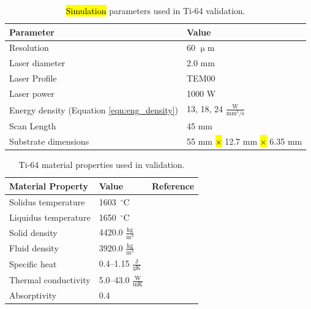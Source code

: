 \documentclass[metals,article,accept,pdftex,moreauthors]{Definitions/mdpi}
\begin{document}
\begin{table}[H]
\caption{\hl{Simulation} %
 parameters used in Ti-64 validation.}
\label{tab:ti64_parameters}
\begin{tabularx}{\textwidth}{CC}
\toprule
\textbf{Parameter} & \textbf{Value} \\ \midrule
Resolution & 60 $\upmu$m \\ \midrule
Laser diameter & 2.0 mm \\ \midrule
Laser Profile & TEM00 \\ \midrule
Laser power & 1000 W \\ \midrule
Energy density (Equation \eqref{eqn:eng_density}) & 13, 18, 24 $\frac{\text{W}}{\text{mm}^3/\text{s}}$ \\ \midrule
Scan Length & 45 mm \\ \midrule
Substrate dimensions & 55 mm \hl{$\times$} %
12.7 mm \hl{$\times$} 6.35 mm \\ 
\bottomrule
\end{tabularx}
\end{table}

\vspace{-12pt}
\begin{table}[H]
\caption{Ti-64 material properties used in validation.}
\label{tab:ti64_properties}
\begin{tabularx}{\textwidth}{CCC}
\toprule
\textbf{Material Property} & \textbf{Value} & \textbf{Reference} \\ \midrule
Solidus temperature & 1603~$^{\circ}$C & \cite{welschgerhard_1993} \\ \midrule
Liquidus temperature & 1650~$^{\circ}$C & \cite{mills_2002} \\ \midrule
Solid density & 4420.0 $\frac{\text{kg}}{\text{m}^3}$ & \cite{mills_2002} \\ \midrule
Fluid density & 3920.0 $\frac{\text{kg}}{\text{m}^3}$ & \cite{mills_2002} \\ \midrule
Specific heat &  0.4--1.15 $\frac{\text{J}}{\text{gK}}$ & \cite{boivineau_2006} \\ \midrule
Thermal conductivity & 5.0--43.0 $\frac{\text{W}}{\text{mK}}$ &~\cite{boivineau_2006} \\ \midrule
Absorptivity & 0.4 &~\cite{fan_2012} \\ 
\bottomrule
\end{tabularx}
\end{table}
\end{document}
